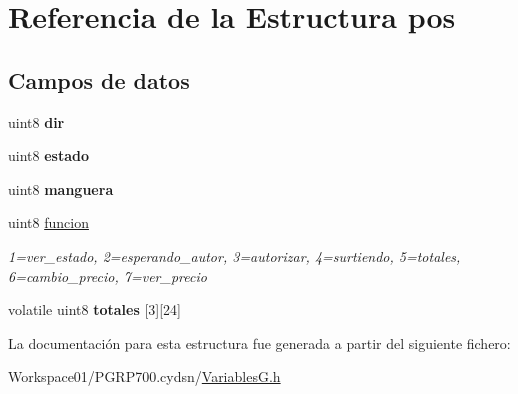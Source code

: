\hypertarget{structpos}{}\section{Referencia de la Estructura pos}
\label{structpos}
\subsection*{Campos de datos}
\begin{DoxyCompactItemize}
\item 
\mbox{\label{structpos_aa70f99e9128c4ddd0b68dd69062853ef}} 
uint8 {\bfseries dir}
\item 
\mbox{\label{structpos_a99c4f14b39922c9c7845cf664808fa4c}} 
uint8 {\bfseries estado}
\item 
\mbox{\label{structpos_a44063ee06b57fe21bcd41b22f2500ce4}} 
uint8 {\bfseries manguera}
\item 
\mbox{\label{structpos_a9ee05b7bc3aaac3d11674988f0784a68}} 
uint8 \mbox{\hyperlink{structpos_a9ee05b7bc3aaac3d11674988f0784a68}{funcion}}
\begin{DoxyCompactList}\small\item\em 1=ver\+\_\+estado, 2=esperando\+\_\+autor, 3=autorizar, 4=surtiendo, 5=totales, 6=cambio\+\_\+precio, 7=ver\+\_\+precio \end{DoxyCompactList}\item 
\mbox{\label{structpos_a3888e6402cf6c872e3b9671740a09bef}} 
volatile uint8 {\bfseries totales} \mbox{[}3\mbox{]}\mbox{[}24\mbox{]}
\end{DoxyCompactItemize}


La documentación para esta estructura fue generada a partir del siguiente fichero\+:\begin{DoxyCompactItemize}
\item 
Workspace01/\+P\+G\+R\+P700.\+cydsn/\mbox{\hyperlink{_variables_g_8h}{Variables\+G.\+h}}\end{DoxyCompactItemize}
